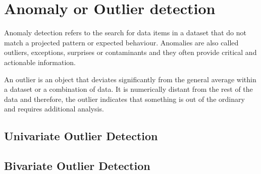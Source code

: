 \section{Anomaly or Outlier detection}

Anomaly detection refers to the search for data items in a dataset that do not match a projected pattern or expected behaviour. Anomalies are also called outliers, exceptions, surprises or contaminants and they often provide critical and actionable information. 

An outlier is an object that deviates significantly from the general average within a dataset or a combination of data. It is numerically distant from the rest of the data and therefore, the outlier indicates that something is out of the ordinary and requires additional analysis.

\subsection{Univariate Outlier Detection}

\subsection{Bivariate Outlier Detection}

